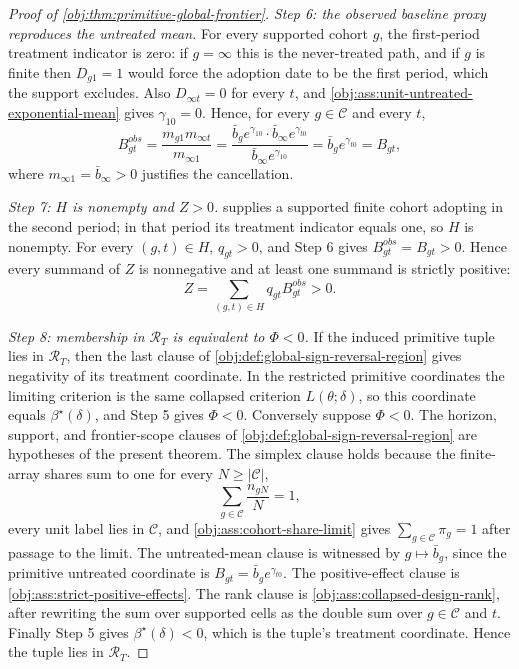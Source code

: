 \documentclass[11pt]{article}
\begin{document}
\begin{proof}[Proof of \cref{obj:thm:primitive-global-frontier}]
\textit{Step 6: the observed baseline proxy reproduces the untreated mean.} For every supported cohort \(g\), the first-period treatment indicator is zero: if \(g=\infty\) this is the never-treated path, and if \(g\) is finite then \(D_{g1}=1\) would force the adoption date to be the first period, which the support excludes. Also \(D_{\infty t}=0\) for every \(t\), and \cref{obj:ass:unit-untreated-exponential-mean} gives \(\gamma_{10}=0\). Hence, for every \(g\in\mathcal C\) and every \(t\),
\[
B^{obs}_{gt}
=
\frac{m_{g1}m_{\infty t}}{m_{\infty 1}}
=
\frac{\bar b_ge^{\gamma_{10}}\cdot\bar b_\infty e^{\gamma_{t0}}}{\bar b_\infty e^{\gamma_{10}}}
=
\bar b_ge^{\gamma_{t0}}
=
B_{gt},
\]
where \(m_{\infty1}=\bar b_\infty>0\) justifies the cancellation.

\textit{Step 7: \(H\) is nonempty and \(Z>0\).}  supplies a supported finite cohort adopting in the second period; in that period its treatment indicator equals one, so \(H\) is nonempty. For every \((g,t)\in H\), \(q_{gt}>0\), and Step 6 gives \(B^{obs}_{gt}=B_{gt}>0\). Hence every summand of \(Z\) is nonnegative and at least one summand is strictly positive:
\[
Z=\sum_{(g,t)\in H}q_{gt}B^{obs}_{gt}>0 .
\]

\textit{Step 8: membership in \(\mathcal R_T\) is equivalent to \(\Phi<0\).} If the induced primitive tuple lies in \(\mathcal R_T\), then the last clause of \cref{obj:def:global-sign-reversal-region} gives negativity of its treatment coordinate. In the restricted primitive coordinates the limiting criterion is the same collapsed criterion \(L(\theta;\delta)\), so this coordinate equals \(\beta^\star(\delta)\), and Step 5 gives \(\Phi<0\).
Conversely suppose \(\Phi<0\). The horizon, support, and frontier-scope clauses of \cref{obj:def:global-sign-reversal-region} are hypotheses of the present theorem. The simplex clause holds because the finite-array shares sum to one for every \(N\ge|\mathcal C|\),
\[
\sum_{g\in\mathcal C}\frac{n_{gN}}{N}=1,
\]
every unit label lies in \(\mathcal C\), and \cref{obj:ass:cohort-share-limit} gives
\(\sum_{g\in\mathcal C}\pi_g=1\) after passage to the limit.
The untreated-mean clause is witnessed by \(g\mapsto\bar b_g\), since the primitive untreated coordinate is \(B_{gt}=\bar b_g e^{\gamma_{t0}}\). The positive-effect clause is \cref{obj:ass:strict-positive-effects}. The rank clause is \cref{obj:ass:collapsed-design-rank}, after rewriting the sum over supported cells as the double sum over \(g\in\mathcal C\) and \(t\). Finally Step 5 gives \(\beta^\star(\delta)<0\), which is the tuple's treatment coordinate. Hence the tuple lies in \(\mathcal R_T\).


\end{proof}
\end{document}
